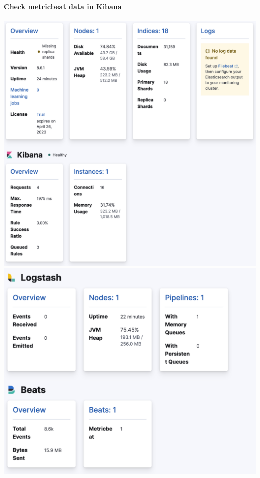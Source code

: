 \documentclass[14pt,a4paper]{extarticle}
\begin{document}
	\newpage

	\noindent \textbf{Check metricbeat data in Kibana} \\ \\
	\includegraphics[height=0.45\textheight]{images/sc12.png} \\
	\includegraphics[height=0.45\textheight]{images/sc13.png}
	
	\newpage
\end{document}
